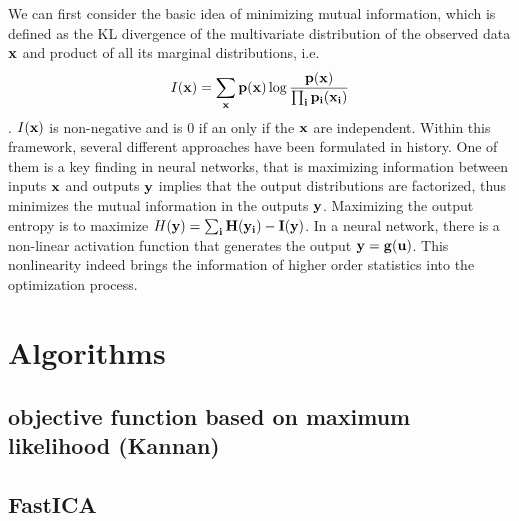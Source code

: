 \documentclass[aps,prl,preprint,superscriptaddress]{revtex4-2}
\begin{document}
We can first consider the basic idea of minimizing mutual information, which is defined as the KL divergence of the multivariate distribution of the observed data $\bf{x}$ and product of all its marginal distributions, i.e. 
\begin{equation}
I(\bf{x}) = \sum_{\bf{x}}p(\bf{x})\log\frac{p(\bf{x})}{\prod_{i}p_{i}(x_{i})}
\end{equation}. $I(\bf{x})$ is non-negative and is 0 if an only if the $\bf{x}$ are independent. Within this framework, several different approaches have been formulated in history. One of them is a key finding in neural networks, that is maximizing information between inputs $\bf{x}$ and outputs $\bf{y}$ implies that the output distributions are factorized, thus minimizes the mutual information in the outputs $\bf{y}$. Maximizing the output entropy is to maximize $H(\bf{y}) = \sum_{i}H(y_{i}) - I(\bf{y})$. In a neural network, there is a non-linear activation function that generates the output $\bf{y} = g(\bf{u})$. This nonlinearity indeed brings the information of higher order statistics into the optimization process.   


\section{Algorithms}
\subsection{objective function based on maximum likelihood  (Kannan)}

\subsection{FastICA}
\end{document}
